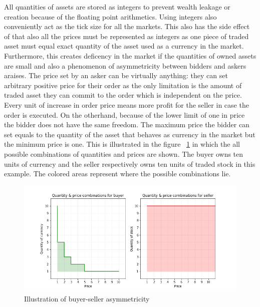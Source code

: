 All quantities of assets are stored as integers to prevent wealth leakage
or creation because of the floating point arithmetics. Using integers also
conveniently act as the tick size for all the markets. This also has the side effect
of that also all the prices must be represented as integers as one piece
of traded asset must equal exact quantity of the asset used as a currency
in the market. Furthermore, this creates deficency in the market if the quantities
of owned assets are small and also a phenomenon of asymmetricity between bidders and askers
araises. The price set by an asker can be virtually anything: they can set
arbitrary positive price for their order as the only limitation is the amount
of traded asset they can commit to the order which is independent on the price. 
Every unit of increase in order price means more profit for the seller
in case the order is executed. On the otherhand, because of the 
lower limit of one in price the bidder does not have the same freedom.
The maximum price the bidder can set equals to the quantity of the asset
that behaves as currency in the market but the minimum price is one. This is
illustrated in the figure ~\ref{fig:buy_sell_asym} in which the all possible
combinations of quantities and prices are shown. The buyer owns
ten units of currency and the seller respectively owns ten units of traded stock in
this example. The colored areas represent where the possible combinations
lie.

 \begin{figure}
    \includegraphics[width=\linewidth]{plots/buyer_seller_asymmetricity.png}
    \caption{Illustration of buyer-seller asymmetricity}
    \label{fig:buy_sell_asym}
\end{figure}

